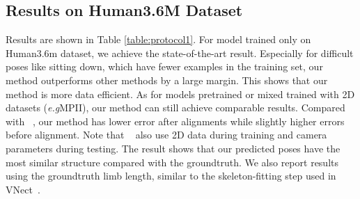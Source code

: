 \documentclass{bmvc2k}
\def\eg{\emph{e.g}\bmvaOneDot}
\begin{document}
\subsection{Results on Human3.6M Dataset}
Results are shown in Table \ref{table:protocol1}. 
For model trained only on Human3.6m dataset, we achieve the state-of-the-art result. Especially for difficult poses like sitting down, which have fewer examples in the training set, our method outperforms other methods by a large margin. This shows that our method is more data efficient. As for models pretrained or mixed trained with 2D datasets (\eg MPII), our method can still achieve comparable results. Compared with ~\cite{sun2017compositional,martinez2017simple}, our method has lower error after alignments while slightly higher errors before alignment. Note that ~\cite{sun2017compositional} also use 2D data during training and camera parameters during testing. The result shows that our predicted poses have the most similar structure compared with the groundtruth. We also report results using the groundtruth limb length, similar to the skeleton-fitting step used in VNect~\cite{VNect_SIGGRAPH2017}.
\end{document}

